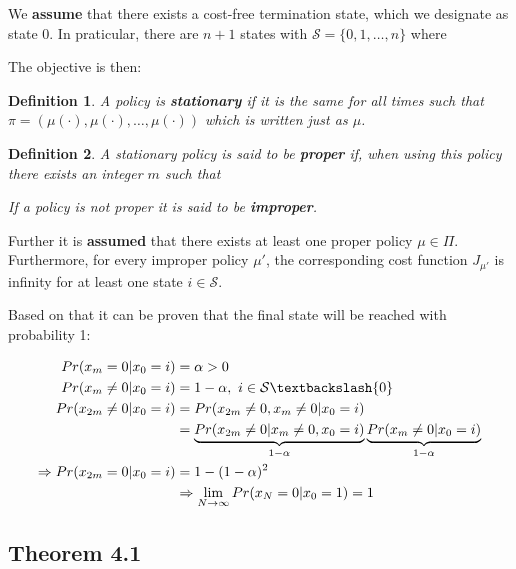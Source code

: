 \documentclass[10pt,a4paper]{scrartcl}
\newtheorem{define}{Definition}
\begin{document}
\begin{multicols*}{2}

We \textbf{assume} that there exists a cost-free termination state, which we designate as state 0. In praticular, there are $n+1$ states with $\mathcal{S}=\{0,1,\ldots,n\}$ where


The objective is then:


\begin{define}
A policy is \textbf{stationary} if it is the same for all times such that $\pi = (\mu(\cdot),\mu(\cdot),\ldots,\mu(\cdot))$ which is written just as $\mu$.
\end{define}

\begin{define}
A stationary policy is said to be \textbf{proper} if, when using this policy there exists an integer $m$ such that


If a policy is not proper it is said to be \textbf{improper}.
\end{define}

Further it is \textbf{assumed} that there exists at least one proper policy $\mu\in\Pi$. Furthermore, for every improper policy $\mu'$, the corresponding cost function $J_{\mu'}$ is infinity for at least one state $i\in\mathcal{S}$.

Based on that it can be proven that the final state will be reached with probability 1:

\begin{align*}
Pr(x_m=0|x_0=i)&=\alpha >0\\
Pr(x_m\neq 0|x_0=i)&=1-\alpha,\ i\in\mathcal{S}\textbackslash\{0\}\\
Pr(x_{2m}\neq 0|x_0=i)&=Pr(x_{2m}\neq 0,x_m\neq 0|x_0=i)\\
&=\underbrace{Pr(x_{2m}\neq 0|x_m\neq 0,x_0=i)}_{1-\alpha}\underbrace{Pr(x_m\neq 0|x_0=i)}_{1-\alpha}\\
\Rightarrow Pr(x_{2m}=0|x_0=i)&=1-(1-\alpha)^2\\
&\Rightarrow \lim\limits_{N\rightarrow \infty}Pr(x_N=0|x_0=1)=1
\end{align*}

\subsection{Theorem 4.1}


\end{multicols*}
\end{document}
